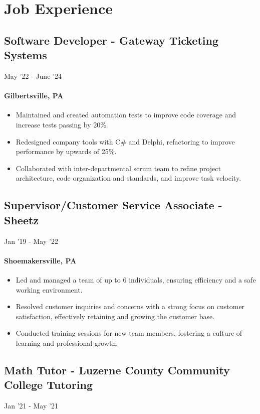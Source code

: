 \documentclass{article}
\begin{document}
\section{Job Experience}
\subsection{Software Developer - Gateway Ticketing Systems} \hfill May '22 - June '24
\paragraph{Gilbertsville, PA}

\begin{itemize}
  \itemsep0em 
  \item Maintained and created automation tests to improve code coverage and increase tests passing by 20\%.
  \item Redesigned company tools with C\# and Delphi, refactoring to improve performance by upwards of 25\%.
  \item Collaborated with inter-departmental scrum team to refine project architecture, code organization and standards, and improve task velocity.
\end{itemize}

\subsection{Supervisor/Customer Service Associate - Sheetz} \hfill Jan '19 - May '22
\paragraph{Shoemakersville, PA}
\begin{itemize}
  \itemsep0em 
  \item Led and managed a team of up to 6 individuals, ensuring efficiency and a safe working environment.
  \item Resolved customer inquiries and concerns with a strong focus on customer satisfaction, effectively retaining and growing the customer base.
  \item Conducted training sessions for new team members, fostering a culture of learning and professional growth.
\end{itemize}

\subsection{Math Tutor - Luzerne County Community College Tutoring} \hfill Jan '21 - May '21
\end{document}

